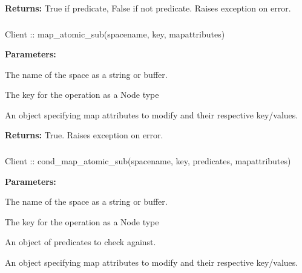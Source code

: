 \noindent\textbf{Returns:}
True if predicate, False if not predicate.  Raises exception on error.

\subsubsection{}
\label{api:nodejs:map_atomic_sub}
\begin{javascriptcode}
Client :: map_atomic_sub(spacename, key, mapattributes)
\end{javascriptcode}
\funcdesc 

\noindent\textbf{Parameters:}
\begin{description}[labelindent=\widthof{{\code{mapattributes}}},leftmargin=*,noitemsep,nolistsep,align=right]
\item[\code{spacename}] The name of the space as a string or buffer.
\item[\code{key}] The key for the operation as a Node type
\item[\code{mapattributes}] An object specifying map attributes to modify and their respective key/values.
\end{description}

\noindent\textbf{Returns:}
True.  Raises exception on error.

\subsubsection{}
\label{api:nodejs:cond_map_atomic_sub}
\begin{javascriptcode}
Client :: cond_map_atomic_sub(spacename, key, predicates, mapattributes)
\end{javascriptcode}
\funcdesc 

\noindent\textbf{Parameters:}
\begin{description}[labelindent=\widthof{{\code{mapattributes}}},leftmargin=*,noitemsep,nolistsep,align=right]
\item[\code{spacename}] The name of the space as a string or buffer.
\item[\code{key}] The key for the operation as a Node type
\item[\code{predicates}] An object of predicates to check against.
\item[\code{mapattributes}] An object specifying map attributes to modify and their respective key/values.
\end{description}

